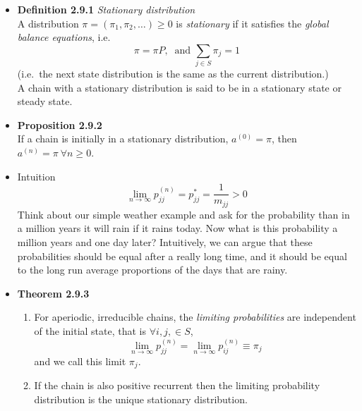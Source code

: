 \documentclass[11pt,a4paper]{article}
\begin{document}
\begin{itemize}

    \item \textbf{Definition 2.9.1} \emph{Stationary distribution} \\
        A distribution $\pi = (\pi_1, \pi_2, \ldots) \geq 0$ is \emph{stationary} if it satisfies the \emph{global balance equations}, i.e.
        \[
            \pi = \pi P,\ \text{ and } \sum_{j \in S} \pi_j = 1
        \]
        (i.e.\ the next state distribution is the same as the current distribution.)\\
        A chain with a stationary distribution is said to be in a stationary state
        or steady state.

    \item \textbf{Proposition 2.9.2} \\
        If a chain is initially in a stationary distribution, $a^{(0)} = \pi$,
        then $a^{(n)} = \pi \ \forall n \geq 0$.

    \item Intuition
        \[
            \lim_{n \to \infty} p_{jj}^{(n)} = p_{jj}^* = \frac{1}{m_{jj}} > 0
        \]
        Think about our simple weather example and ask for the probability than in a million
        years it will rain if it rains today.
        Now what is this probability a million years and one day later?
        Intuitively, we can argue that these probabilities should be equal
        after a really long time,
        and it should be equal to the long run average proportions of the days that are rainy.

    \item \textbf{Theorem 2.9.3}
        \begin{enumerate}
            \item For aperiodic, irreducible chains, the \emph{limiting probabilities}
                are independent of the initial state, that is $\forall i, j, \in S$,
                \[
                    \lim_{n \to \infty}p_{jj}^{(n)} =
                    \lim_{n \to \infty} p_{ij}^{(n)} \equiv \pi_j
                \]
                and we call this limit $\pi_j$.
            \item If the chain is also positive recurrent then the limiting probability
                distribution is the unique stationary distribution.
        \end{enumerate}

\end{itemize}
\end{document}
